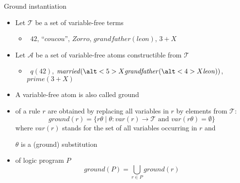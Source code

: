 \begin{frame}{Ground instantiation}

  \begin{itemize}
  \item<2-> Let $\mathcal{T}$ be a set of variable-free \alert<2-3>{terms}
    \smallskip
    \begin{itemize}\normalsize
    \item<only@3-5>  \ $42$, ``$\mathit{cou cou}$'', $\mathit{Zorro}$, $\mathit{grandfather}(\mathit{leon})$, $3+X$
    \end{itemize}
    \smallskip
  \item<2-> Let $\mathcal{A}$ be a set of variable-free \alert<2-3>{atoms} constructible from $\mathcal{T}$
    \smallskip
    \begin{itemize}\normalsize
    \item<only@3-5>  \ $q(42)$, $\mathit{married}(\alt<5>{X}{\mathit{grandfather}(\alt<4>{X}{\mathit{leon}})})$, $\mathit{prime}(3+X)$
    \end{itemize}
    \medskip
  \item<8-> A variable-free atom is also called \alert{ground}
    \medskip
  \item<9->  of a rule $r$ are obtained by
    replacing all variables in $r$ by elements from $\mathcal{T}$:
    \[
    \mathit{ground}(r)=\{r\theta\mid\theta:\mathit{var}(r)\rightarrow \mathcal{T} \text{ and } \mathit{var}(r\theta)=\emptyset\}
    \]
    where $\mathit{var}(r)$ stands for the set of all variables occurring in $r$ and

    $\theta$ is a (ground) substitution
    \medskip
  \item<10->  of logic program $P$
    \[
    \mathit{ground}(P)=\textstyle\bigcup_{r\in P}\mathit{ground}(r)
    \]
  \end{itemize}
\end{frame}
%

